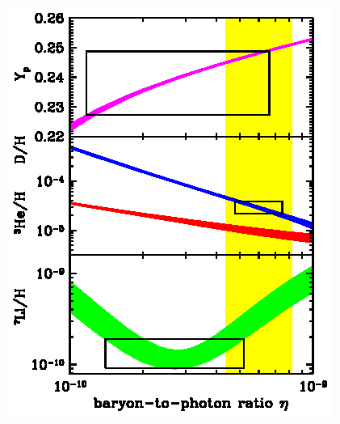 \documentclass[12pt]{article}
\begin{document}
\pagebreak

\begin{minipage}{\linewidth}
  \vspace{0 cm}
  \hspace{-1 cm} \includegraphics[width=\linewidth]{elemental_abundances2.eps}
\end{minipage}

\pagebreak
\end{document}
